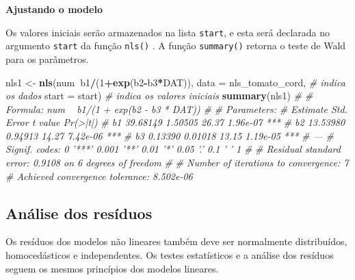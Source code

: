 \documentclass[
]{book}
\newenvironment{Shaded}{\begin{snugshade}}{\end{snugshade}}
\newcommand{\CommentTok}[1]{\textcolor[rgb]{0.56,0.35,0.01}{\textit{#1}}}
\newcommand{\DataTypeTok}[1]{\textcolor[rgb]{0.13,0.29,0.53}{#1}}
\newcommand{\DecValTok}[1]{\textcolor[rgb]{0.00,0.00,0.81}{#1}}
\newcommand{\KeywordTok}[1]{\textcolor[rgb]{0.13,0.29,0.53}{\textbf{#1}}}
\newcommand{\NormalTok}[1]{#1}
\newcommand{\OperatorTok}[1]{\textcolor[rgb]{0.81,0.36,0.00}{\textbf{#1}}}
\newcommand{\StringTok}[1]{\textcolor[rgb]{0.31,0.60,0.02}{#1}}
\begin{document}
\textbf{Ajustando o modelo}

Os valores iniciais serão armazenados na lista \texttt{start}, e esta será declarada no argumento \texttt{start} da função \texttt{nls()}  . A função \texttt{summary()}  retorna o teste de Wald para os parâmetros.

\begin{Shaded}
\begin{Highlighting}[]
\NormalTok{nls1 <-}\StringTok{ }\KeywordTok{nls}\NormalTok{(num}\OperatorTok{~}\NormalTok{b1}\OperatorTok{/}\NormalTok{(}\DecValTok{1}\OperatorTok{+}\KeywordTok{exp}\NormalTok{(b2}\OperatorTok{-}\NormalTok{b3}\OperatorTok{*}\NormalTok{DAT)), }
         \DataTypeTok{data =}\NormalTok{ nls_tomato_cord, }\CommentTok{# indica os dados}
         \DataTypeTok{start =}\NormalTok{ start) }\CommentTok{# indica os valores iniciais}
\KeywordTok{summary}\NormalTok{(nls1)}
\CommentTok{# }
\CommentTok{# Formula: num ~ b1/(1 + exp(b2 - b3 * DAT))}
\CommentTok{# }
\CommentTok{# Parameters:}
\CommentTok{#    Estimate Std. Error t value Pr(>|t|)    }
\CommentTok{# b1 39.68149    1.50505   26.37 1.96e-07 ***}
\CommentTok{# b2 13.53980    0.94913   14.27 7.42e-06 ***}
\CommentTok{# b3  0.13390    0.01018   13.15 1.19e-05 ***}
\CommentTok{# ---}
\CommentTok{# Signif. codes:  0 '***' 0.001 '**' 0.01 '*' 0.05 '.' 0.1 ' ' 1}
\CommentTok{# }
\CommentTok{# Residual standard error: 0.9108 on 6 degrees of freedom}
\CommentTok{# }
\CommentTok{# Number of iterations to convergence: 7 }
\CommentTok{# Achieved convergence tolerance: 8.502e-06}
\end{Highlighting}
\end{Shaded}

\hypertarget{anuxe1lise-dos-resuxedduos-1}{%
\subsection{Análise dos resíduos}\label{anuxe1lise-dos-resuxedduos-1}}

Os resíduos  dos modelos não lineares também deve ser normalmente distribuídos, homocedásticos e independentes. Os testes estatísticos e a análise dos resíduos seguem os mesmos princípios dos modelos lineares.
\end{document}
